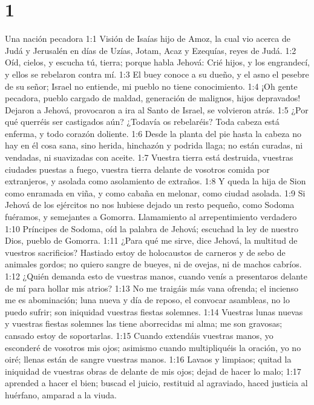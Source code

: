 
\chapter{1}



Una nación pecadora  
1:1 Visión de Isaías hijo de Amoz, la cual vio acerca de Judá y Jerusalén en días de Uzías, Jotam, Acaz y Ezequías, reyes de Judá.  
1:2 Oíd, cielos, y escucha tú, tierra; porque habla Jehová: Crié hijos, y los engrandecí, y ellos se rebelaron contra mí.  
1:3 El buey conoce a su dueño, y el asno el pesebre de su señor; Israel no entiende, mi pueblo no tiene conocimiento.  
1:4 ¡Oh gente pecadora, pueblo cargado de maldad, generación de malignos, hijos depravados! Dejaron a Jehová, provocaron a ira al Santo de Israel, se volvieron atrás.  
1:5 ¿Por qué querréis ser castigados aún? ¿Todavía os rebelaréis? Toda cabeza está enferma, y todo corazón doliente.  
1:6 Desde la planta del pie hasta la cabeza no hay en él cosa sana, sino herida, hinchazón y podrida llaga; no están curadas, ni vendadas, ni suavizadas con aceite.  
1:7 Vuestra tierra está destruida, vuestras ciudades puestas a fuego, vuestra tierra delante de vosotros comida por extranjeros, y asolada como asolamiento de extraños.  
1:8 Y queda la hija de Sion como enramada en viña, y como cabaña en melonar, como ciudad asolada.  
1:9 Si Jehová de los ejércitos no nos hubiese dejado un resto pequeño, como Sodoma fuéramos, y semejantes a Gomorra. 
Llamamiento al arrepentimiento verdadero  
1:10 Príncipes de Sodoma, oíd la palabra de Jehová; escuchad la ley de nuestro Dios, pueblo de Gomorra.  
1:11 ¿Para qué me sirve, dice Jehová, la multitud de vuestros sacrificios? Hastiado estoy de holocaustos de carneros y de sebo de animales gordos; no quiero sangre de bueyes, ni de ovejas, ni de machos cabríos.  
1:12 ¿Quién demanda esto de vuestras manos, cuando venís a presentaros delante de mí para hollar mis atrios?  
1:13 No me traigáis más vana ofrenda; el incienso me es abominación; luna nueva y día de reposo, el convocar asambleas, no lo puedo sufrir; son iniquidad vuestras fiestas solemnes.  
1:14 Vuestras lunas nuevas y vuestras fiestas solemnes las tiene aborrecidas mi alma; me son gravosas; cansado estoy de soportarlas.  
1:15 Cuando extendáis vuestras manos, yo esconderé de vosotros mis ojos; asimismo cuando multipliquéis la oración, yo no oiré; llenas están de sangre vuestras manos.  
1:16 Lavaos y limpiaos; quitad la iniquidad de vuestras obras de delante de mis ojos; dejad de hacer lo malo;  
1:17 aprended a hacer el bien; buscad el juicio, restituid al agraviado, haced justicia al huérfano, amparad a la viuda.  
